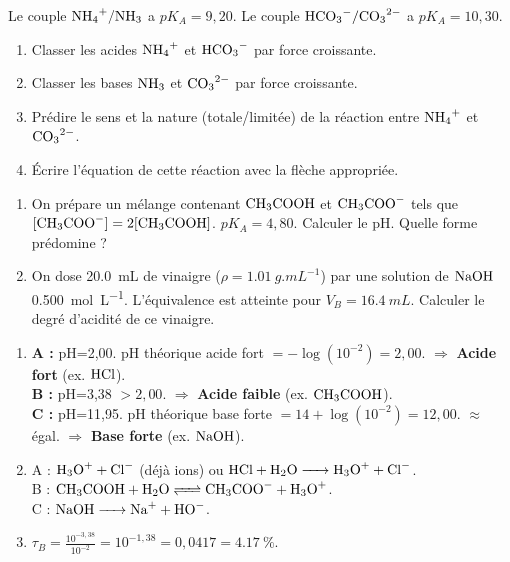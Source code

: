 \documentclass[11pt]{article}
\begin{document}
\begin{exercice}
Le couple $\ce{NH4+}/\ce{NH3}$ a $pK_A = 9,20$. Le couple $\ce{HCO3-}/\ce{CO3^2-}$ a $pK_A = 10,30$.
\begin{enumerate}
  \item Classer les acides $\ce{NH4+}$ et $\ce{HCO3-}$ par force croissante.
  \item Classer les bases $\ce{NH3}$ et $\ce{CO3^2-}$ par force croissante.
  \item Prédire le sens et la nature (totale/limitée) de la réaction entre $\ce{NH4+}$ et $\ce{CO3^2-}$.
  \item Écrire l'équation de cette réaction avec la flèche appropriée.
\end{enumerate}
\end{exercice}

\begin{exercice}
\begin{enumerate}
  \item On prépare un mélange contenant $\ce{CH3COOH}$ et $\ce{CH3COO-}$ tels que $[\ce{CH3COO-}] = 2[\ce{CH3COOH}]$. $pK_A = 4,80$. Calculer le pH. Quelle forme prédomine ?
  \item On dose \SI{20,0}{mL} de vinaigre ($\rho = \SI{1,01}{g.mL^{-1}}$) par une solution de $\ce{NaOH}$ \SI{0,500}{mol.L^{-1}}. L'équivalence est atteinte pour $V_B = \SI{16,4}{mL}$. Calculer le degré d'acidité de ce vinaigre.
\end{enumerate}
\end{exercice}

\begin{corrige}
\begin{enumerate}
  \item \textbf{A :} pH=2,00. pH théorique acide fort $=-\log(10^{-2})=2,00$. $\Rightarrow$ \textbf{Acide fort} (ex. $\ce{HCl}$).\\
  \textbf{B :} pH=3,38 $> 2,00$. $\Rightarrow$ \textbf{Acide faible} (ex. $\ce{CH3COOH}$).\\
  \textbf{C :} pH=11,95. pH théorique base forte $=14+\log(10^{-2})=12,00$. $\approx$ égal. $\Rightarrow$ \textbf{Base forte} (ex. $\ce{NaOH}$).
  \item A : $\ce{H3O+ + Cl-}$ (déjà ions) ou $\ce{HCl + H2O -> H3O+ + Cl-}$.\\
  B : $\ce{CH3COOH + H2O <=> CH3COO- + H3O+}$.\\
  C : $\ce{NaOH -> Na+ + HO-}$.
  \item $\tau_B = \frac{10^{-3,38}}{10^{-2}} = 10^{-1,38} = 0,0417 = \SI{4,17}{\%}$.
\end{enumerate}
\end{corrige}
\end{document}
